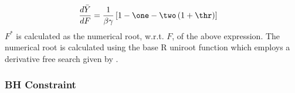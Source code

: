 %
\vspace{-0.75cm}
\begingroup
\scriptsize
\begin{align}
\frac{d \bar{Y}}{dF} &= \frac{1}{\beta\gamma}\left[ 1 - \one - \two \left( 1 + \thr \right) \right]\label{dBdFS}
\end{align}
\endgroup
%
$F^*$ is calculated as the numerical root, w.r.t. $F$, of the above expression. 
The numerical root is calculated using the base R uniroot function which 
employs a derivative free search given by .  

%
\subsubsection{BH Constraint}

